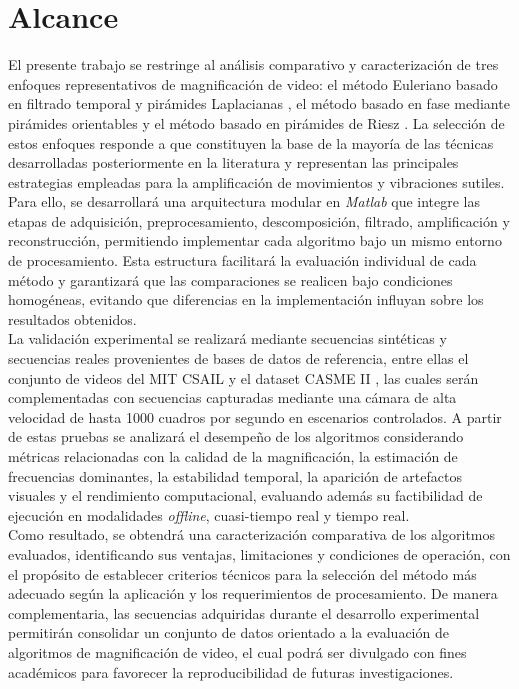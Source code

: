 \section{Alcance}
\label{sec:Alcance}
El presente trabajo se restringe al análisis comparativo y caracterización de tres enfoques representativos de magnificación de video: el método Euleriano basado en filtrado temporal y pirámides Laplacianas \cite{wu2012eulerian}, el método basado en fase mediante pirámides orientables \cite{wadhwa2013phase} y el método basado en pirámides de Riesz \cite{wadhwa2014riesz}. La selección de estos enfoques responde a que constituyen la base de la mayoría de las técnicas desarrolladas posteriormente en la literatura y representan las principales estrategias empleadas para la amplificación de movimientos y vibraciones sutiles.\\

Para ello, se desarrollará una arquitectura modular en \textit{Matlab} que integre las etapas de adquisición, preprocesamiento, descomposición, filtrado, amplificación y reconstrucción, permitiendo implementar cada algoritmo bajo un mismo entorno de procesamiento. Esta estructura facilitará la evaluación individual de cada método y garantizará que las comparaciones se realicen bajo condiciones homogéneas, evitando que diferencias en la implementación influyan sobre los resultados obtenidos.\\

La validación experimental se realizará mediante secuencias sintéticas y secuencias reales provenientes de bases de datos de referencia, entre ellas el conjunto de videos del MIT CSAIL \cite{wu2012eulerian} y el dataset CASME II \cite{yan2014casme}, las cuales serán complementadas con secuencias capturadas mediante una cámara de alta velocidad de hasta 1000 cuadros por segundo en escenarios controlados. A partir de estas pruebas se analizará el desempeño de los algoritmos considerando métricas relacionadas con la calidad de la magnificación, la estimación de frecuencias dominantes, la estabilidad temporal, la aparición de artefactos visuales y el rendimiento computacional, evaluando además su factibilidad de ejecución en modalidades \textit{offline}, cuasi-tiempo real y tiempo real.\\

Como resultado, se obtendrá una caracterización comparativa de los algoritmos evaluados, identificando sus ventajas, limitaciones y condiciones de operación, con el propósito de establecer criterios técnicos para la selección del método más adecuado según la aplicación y los requerimientos de procesamiento. De manera complementaria, las secuencias adquiridas durante el desarrollo experimental permitirán consolidar un conjunto de datos orientado a la evaluación de algoritmos de magnificación de video, el cual podrá ser divulgado con fines académicos para favorecer la reproducibilidad de futuras investigaciones.\\

